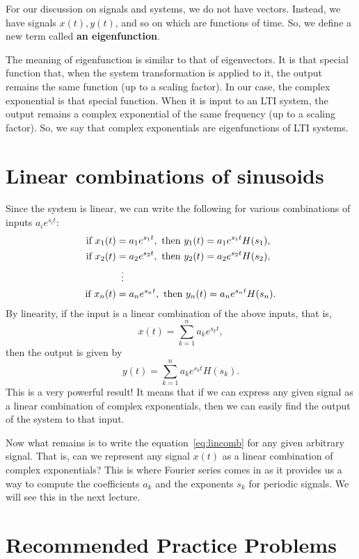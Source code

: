 For our discussion on signals and systems, we do not have vectors. Instead, we have signals $x(t), y(t)$, and so on which are functions of time. So, we define a new term called \textbf{an eigenfunction}.

The meaning of eigenfunction is similar to that of eigenvectors. It is that special function that, when the system transformation is applied to it, the output remains the same function (up to a scaling factor). In our case, the complex exponential is that special function. When it is input to an LTI system, the output remains a complex exponential of the same frequency (up to a scaling factor). So, we say that complex exponentials are eigenfunctions of LTI systems.

\section{Linear combinations of sinusoids}
Since the system is linear, we can write the following for various combinations of inputs $a_i e^{s_i t}$:
\begin{align*}
  \text{if } x_1(t) &= a_1 e^{s_1 t}, \text{ then } y_1(t) = a_1 e^{s_1 t} H(s_1), \\
  \text{if } x_2(t) &= a_2 e^{s_2 t}, \text{ then } y_2(t) = a_2 e^{s_2 t} H(s_2), \\
  &\vdotswithin{=} \\
  \text{if } x_n(t) &= a_n e^{s_n t}, \text{ then } y_n(t) = a_n e^{s_n t} H(s_n).
\end{align*}
By linearity, if the input is a linear combination of the above inputs, that is,
\begin{equation}
x(t) = \sum_{k=1}^{n} a_k e^{s_k t},
\label{eq:lincomb}
\end{equation}
then the output is given by
\[
y(t) = \sum_{k=1}^{n} a_k e^{s_k t} H(s_k).
\]
This is a very powerful result! It means that if we can express any given signal as a linear combination of complex exponentials, then we can easily find the output of the system to that input.

Now what remains is to write the equation~\eqref{eq:lincomb} for any given arbitrary signal. That is, can we represent any signal $x(t)$ as a linear combination of complex exponentials? This is where Fourier series comes in as it provides us a way to compute the coefficients \(a_k\) and the exponents \(s_k\) for periodic signals. We will see this in the next lecture.
\section{Recommended Practice Problems}

